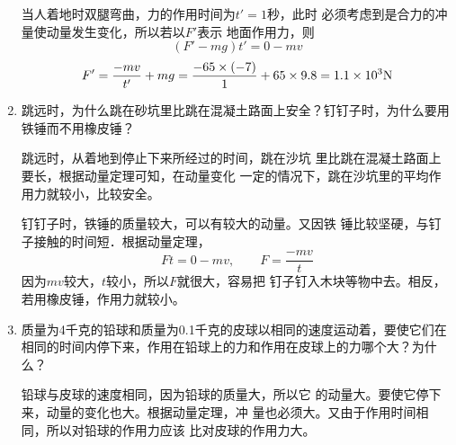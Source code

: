 \begin{enumerate}
\begin{solution}
当人着地时双腿弯曲，力的作用时间为$t'=1$秒，此时
必须考虑到是合力的冲量使动量发生变化，所以若以$F'$表示
地面作用力，则
\[(F'-mg)t'=0-mv\]
\[F'=\frac{-mv}{t'}+mg=\frac{-65\times (-7)}{1}+65\times 9.8=1.1\times 10^{3}{\rm N}\]
    \end{solution}
    \item 跳远时，为什么跳在砂坑里比跳在混凝土路面上安全？钉钉子时，为什么要用铁锤而不用橡皮锤？


    \begin{solution}
    跳远时，从着地到停止下来所经过的时间，跳在沙坑
里比跳在混凝土路面上要长，根据动量定理可知，在动量变化
一定的情况下，跳在沙坑里的平均作用力就较小，比较安全。

钉钉子时，铁锤的质量较大，可以有较大的动量。又因铁
锤比较坚硬，与钉子接触的时间短．根据动量定理，
\[Ft=0-mv,\qquad F=\frac{-mv}{t}\]
因为$mv$较大，$t$较小，所以$F$就很大，容易把
钉子钉入木块等物中去。相反，若用橡皮锤，作用力就较小。
    \end{solution}
    \item 质量为4千克的铅球和质量为0.1千克的皮球以相同的速度运动着，要使它们在相同的时间内停下来，作用在铅球上的力和作用在皮球上的力哪个大？为什么？


    \begin{solution}
    铅球与皮球的速度相同，因为铅球的质量大，所以它
的动量大。要使它停下来，动量的变化也大。根据动量定理，冲
量也必须大。又由于作用时间相同，所以对铅球的作用力应该
比对皮球的作用力大。
    \end{solution}
\end{enumerate}


